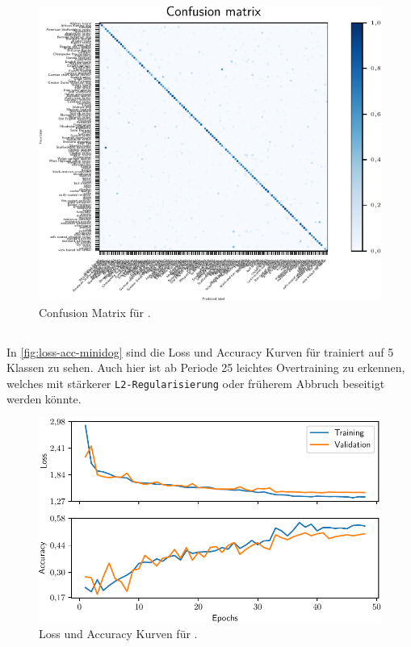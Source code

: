 \begin{figure}
  \centering
  \includegraphics[scale=0.8]{pics/ergebnisse/PreBigDogNN/confusion_matrix.pdf}
  \caption{Confusion Matrix für \PreBig.}
  \label{fig:confusion-prebig}
\end{figure}

\subsection{\MiniDog}

In \autoref{fig:loss-acc-minidog} sind die Loss und Accuracy Kurven für \MiniDog
trainiert auf 5 Klassen zu sehen. Auch hier ist ab Periode 25 leichtes
Overtraining zu erkennen, welches mit stärkerer \texttt{L2-Regularisierung} oder
früherem Abbruch beseitigt werden könnte.

\begin{figure}
  \centering
  \includegraphics[scale=0.8]{pics/ergebnisse/MiniDogNN/history.pdf}
  \caption{Loss und Accuracy Kurven für \MiniDog.}
  \label{fig:loss-acc-minidog}
\end{figure}

